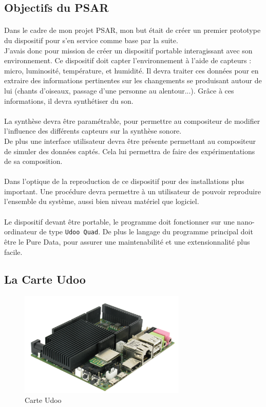 \documentclass[a4paper, titlepage, oneside, 12pt]{article}%
\begin{document}
\subsection{Objectifs du PSAR}
\paragraph{}
Dans le cadre de mon projet PSAR, mon but était de créer un premier prototype du dispositif pour s'en service comme base par la suite.\\
J'avais donc pour mission de créer un dispositif portable interagissant avec son environnement. Ce dispositif doit capter l'environnement à l'aide de capteurs : micro, luminosité, température, et humidité. Il devra traiter ces données pour en extraire des informations pertinentes sur les changements se produisant autour de lui (chants d'oiseaux, passage d'une personne au alentour...). Grâce à ces informations, il devra synthétiser du son.
\paragraph{}
La synthèse devra être paramétrable, pour permettre au compositeur de modifier
l’influence des différents capteurs sur la synthèse sonore.\\
De plus une interface utilisateur devra être présente permettant au compositeur de simuler des données captés. Cela lui permettra de faire des expérimentations de sa composition.
\paragraph{}
Dans l’optique de la reproduction de ce dispositif pour des installations plus important. Une procédure devra permettre à un utilisateur de pouvoir reproduire l’ensemble du système, aussi bien niveau matériel que logiciel.
\paragraph{}
Le dispositif devant être portable, le programme doit fonctionner sur une nano-ordinateur de type \texttt{Udoo Quad}. De plus le langage du programme principal doit être le Pure Data, pour assurer une maintenabilité et une extensionnalité plus facile.
\subsection{La Carte Udoo}
\begin{figure}
  \centering
  \includegraphics[width=300px]{udoo.jpg}
  \caption{Carte Udoo}
\end{figure}
\end{document}
